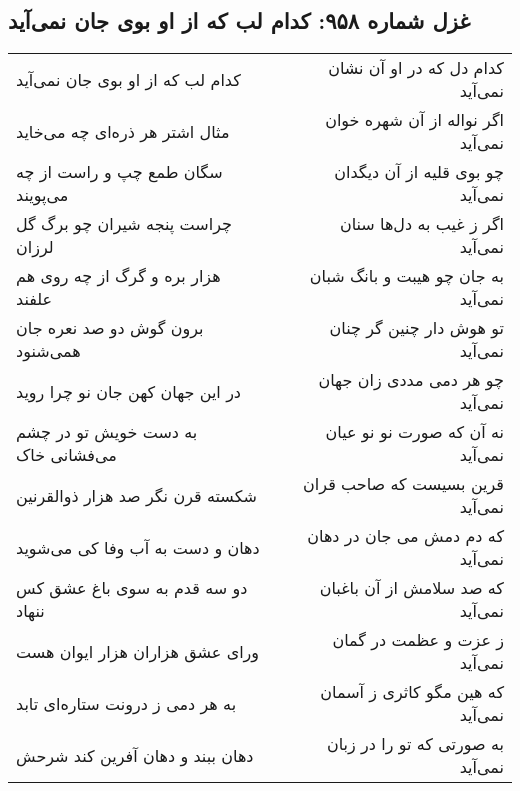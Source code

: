 \begin{center}
\section*{غزل شماره ۹۵۸: کدام لب که از او بوی جان نمی‌آید}
\label{sec:0958}
\begin{longtable}{l p{0.5cm} r}
کدام لب که از او بوی جان نمی‌آید
&&
کدام دل که در او آن نشان نمی‌آید
\\
مثال اشتر هر ذره‌ای چه می‌خاید
&&
اگر نواله از آن شهره خوان نمی‌آید
\\
سگان طمع چپ و راست از چه می‌پویند
&&
چو بوی قلیه از آن دیگدان نمی‌آید
\\
چراست پنجه شیران چو برگ گل لرزان
&&
اگر ز غیب به دل‌ها سنان نمی‌آید
\\
هزار بره و گرگ از چه روی هم علفند
&&
به جان چو هیبت و بانگ شبان نمی‌آید
\\
برون گوش دو صد نعره جان همی‌شنود
&&
تو هوش دار چنین گر چنان نمی‌آید
\\
در این جهان کهن جان نو چرا روید
&&
چو هر دمی مددی زان جهان نمی‌آید
\\
به دست خویش تو در چشم می‌فشانی خاک
&&
نه آن که صورت نو نو عیان نمی‌آید
\\
شکسته قرن نگر صد هزار ذوالقرنین
&&
قرین بسیست که صاحب قران نمی‌آید
\\
دهان و دست به آب وفا کی می‌شوید
&&
که دم دمش می جان در دهان نمی‌آید
\\
دو سه قدم به سوی باغ عشق کس ننهاد
&&
که صد سلامش از آن باغبان نمی‌آید
\\
ورای عشق هزاران هزار ایوان هست
&&
ز عزت و عظمت در گمان نمی‌آید
\\
به هر دمی ز درونت ستاره‌ای تابد
&&
که هین مگو کاثری ز آسمان نمی‌آید
\\
دهان ببند و دهان آفرین کند شرحش
&&
به صورتی که تو را در زبان نمی‌آید
\\
\end{longtable}
\end{center}
